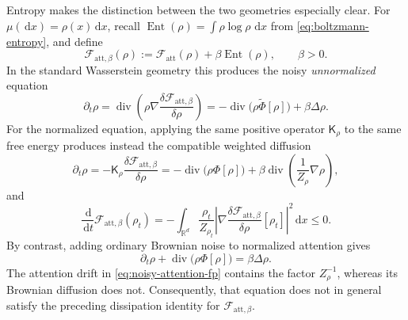 \documentclass[11pt]{amsart}
\numberwithin{equation}{section}
\theoremstyle{plain}
\newcommand{\R}{\mathbb{R}}
\newcommand{\dd}{\,\mathrm{d}}
\DeclareMathOperator{\diver}{div}
\begin{document}
Entropy makes the distinction between the two geometries especially clear.
For $\mu(\dd x)=\rho(x)\dd x$, recall
$\operatorname{Ent}(\rho)=\int\rho\log\rho\,\dd x$ from
\eqref{eq:boltzmann-entropy}, and define
\begin{equation}\label{eq:diffusive-attention-free-energy}
 \mathcal F_{\mathrm{att},\beta}(\rho)
 :=\mathcal F_{\mathrm{att}}(\rho)
   +\beta\operatorname{Ent}(\rho),\qquad \beta>0.
\end{equation}
In the standard Wasserstein geometry this produces the noisy
\emph{unnormalized} equation
\begin{equation}\label{eq:unnormalized-noisy-attention-fp}
 \partial_t\rho
 =\diver\left(\rho\nabla
 \frac{\delta\mathcal F_{\mathrm{att},\beta}}{\delta\rho}\right)
 =-\diver\bigl(\rho\widetilde\Phi[\rho]\bigr)+\beta\Delta\rho.
\end{equation}
For the normalized equation, applying the same positive operator
$\mathsf K_\rho$ to the same free energy produces instead the compatible
weighted diffusion
\begin{equation}\label{eq:normalized-weighted-diffusion}
 \partial_t\rho  = - \mathsf K_\rho
 \frac{\delta\mathcal F_{\mathrm{att},\beta}}{\delta\rho}
 =-\diver\bigl(\rho\Phi[\rho]\bigr)
  +\beta\diver\left(\frac1{Z_\rho}\nabla\rho\right),
\end{equation}
and
\[
 \frac{\dd}{\dd t}\mathcal F_{\mathrm{att},\beta}(\rho_t)
 =-\int_{\R^d}\frac{\rho_t}{Z_{\rho_t}}
 \left|\nabla
 \frac{\delta\mathcal F_{\mathrm{att},\beta}}{\delta\rho}[\rho_t]
 \right|^2\dd x\leq0.
\]
By contrast, adding ordinary Brownian noise to normalized attention gives
\begin{equation}\label{eq:noisy-attention-fp}
 \partial_t\rho+\diver\bigl(\rho\Phi[\rho]\bigr)=\beta\Delta\rho.
\end{equation}
The attention drift in \eqref{eq:noisy-attention-fp} contains the factor
$Z_\rho^{-1}$, whereas its Brownian diffusion does not.  Consequently, that
equation does not in general satisfy the preceding dissipation identity for
$\mathcal F_{\mathrm{att},\beta}$.
\end{document}
